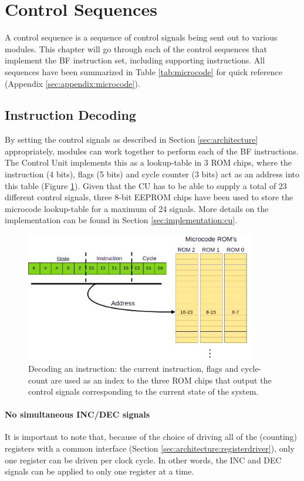 \section{Control Sequences} \label{sec:sequences}

A control sequence is a sequence of control signals being sent out to various modules. This chapter will go through each of the control sequences that implement the BF instruction set, including supporting instructions. All sequences have been summarized in Table \ref{tab:microcode} for quick reference (Appendix \ref{sec:appendix:microcode}).

\subsection{Instruction Decoding}
By setting the control signals as described in Section \ref{sec:architecture} appropriately, modules can work together to perform each of the BF instructions. The Control Unit implements this as a lookup-table in 3 ROM chips, where the instruction (4 bits), flags (5 bits) and cycle counter (3 bits) act as an address into this table (Figure \ref{fig:decoder}). Given that the CU has to be able to supply a total of 23 different control signals, three 8-bit EEPROM chips have been used to store the microcode lookup-table for a maximum of 24 signals. More details on the implementation can be found in Section \ref{sec:implementation:cu}. 
\begin{figure}[h]
  \centering
  \includegraphics[width=0.9\textwidth]{img/instruction_decoding}
  \caption{Decoding an instruction: the current instruction, flags and cycle-count are used as an index to the three ROM chips that output the control signals corresponding to the current state of the system.}
  \label{fig:decoder}
\end{figure}

\paragraph{No simultaneous INC/DEC signals} It is important to note that, because of the choice of driving all of the (counting) registers with a common interface (Section \ref{sec:architecture:registerdriver}), only one register can be driven per clock cycle. In other words, the INC and DEC signals can be applied to only one register at a time. 


